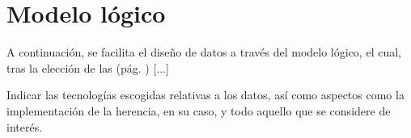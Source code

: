 \section{Modelo lógico}
\label{ref:logicalModel}

A continuación, se facilita el diseño de datos a través del modelo lógico, el cual, tras la elección de las  (pág. \pageref{sec:technologicalChoices}) [...]

\begin{shaded}
Indicar las tecnologías escogidas relativas a los datos, así como aspectos como la implementación de la herencia, en su caso, y todo aquello que se considere de interés.
\end{shaded}

